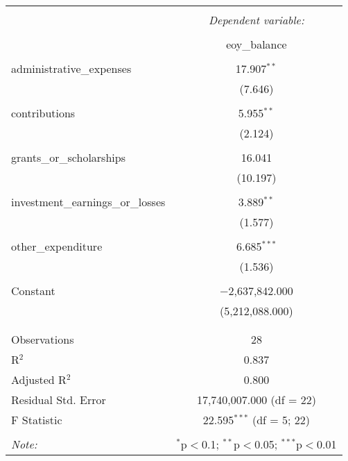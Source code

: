 
\begin{table}[!htbp] \centering 
  \caption{} 
  \label{} 
\begin{tabular}{@{\extracolsep{5pt}}lc} 
\\[-1.8ex]\hline 
\hline \\[-1.8ex] 
 & \multicolumn{1}{c}{\textit{Dependent variable:}} \\ 
\cline{2-2} 
\\[-1.8ex] & eoy\_balance \\ 
\hline \\[-1.8ex] 
 administrative\_expenses & 17.907$^{**}$ \\ 
  & (7.646) \\ 
  & \\ 
 contributions & 5.955$^{**}$ \\ 
  & (2.124) \\ 
  & \\ 
 grants\_or\_scholarships & 16.041 \\ 
  & (10.197) \\ 
  & \\ 
 investment\_earnings\_or\_losses & 3.889$^{**}$ \\ 
  & (1.577) \\ 
  & \\ 
 other\_expenditure & 6.685$^{***}$ \\ 
  & (1.536) \\ 
  & \\ 
 Constant & $-$2,637,842.000 \\ 
  & (5,212,088.000) \\ 
  & \\ 
\hline \\[-1.8ex] 
Observations & 28 \\ 
R$^{2}$ & 0.837 \\ 
Adjusted R$^{2}$ & 0.800 \\ 
Residual Std. Error & 17,740,007.000 (df = 22) \\ 
F Statistic & 22.595$^{***}$ (df = 5; 22) \\ 
\hline 
\hline \\[-1.8ex] 
\textit{Note:}  & \multicolumn{1}{r}{$^{*}$p$<$0.1; $^{**}$p$<$0.05; $^{***}$p$<$0.01} \\ 
\end{tabular} 
\end{table} 
